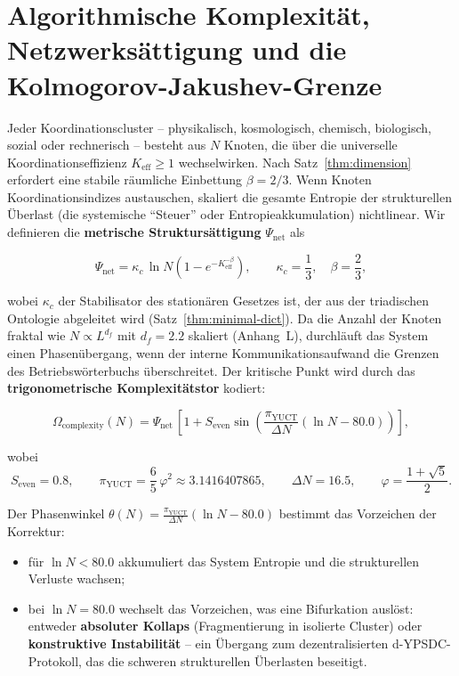 \documentclass[12pt,a4paper]{article}
\theoremstyle{remark}
\newcommand{\Keff}{K_{\mathrm{eff}}}
\newcommand{\kappac}{\kappa_c}
\newcommand{\Seven}{S_{\mathrm{even}}}
\newcommand{\piYUCT}{\pi_{\mathrm{YUCT}}}
\begin{document}
	\sloppy
	\section{Algorithmische Komplexität, Netzwerksättigung und die Kolmogorov-Jakushev-Grenze}
	\label{sec:complexity}
	
	Jeder Koordinationscluster -- physikalisch, kosmologisch, chemisch, biologisch,
	sozial oder rechnerisch -- besteht aus \(N\) Knoten, die über die universelle
	Koordinationseffizienz \(\Keff \ge 1\) wechselwirken. Nach Satz~\ref{thm:dimension}
	erfordert eine stabile räumliche Einbettung \(\beta = 2/3\). Wenn Knoten
	Koordinationsindizes austauschen, skaliert die gesamte Entropie der strukturellen
	Überlast (die systemische ``Steuer'' oder Entropieakkumulation) nichtlinear. Wir
	definieren die \textbf{metrische Struktursättigung} \(\Psi_{\mathrm{net}}\) als
	
	\begin{equation}
		\Psi_{\mathrm{net}} = \kappac \, \ln N \left(1 - e^{-\Keff^{-\beta}}\right),
		\qquad \kappac = \frac{1}{3},\quad \beta = \frac{2}{3},
		\label{eq:Psi_net}
	\end{equation}
	
	wobei \(\kappac\) der Stabilisator des stationären Gesetzes ist, der aus der
	triadischen Ontologie abgeleitet wird (Satz~\ref{thm:minimal-dict}). Da die
	Anzahl der Knoten fraktal wie \(N \propto L^{d_f}\) mit \(d_f = 2.2\) skaliert
	(Anhang~L), durchläuft das System einen Phasenübergang, wenn der interne
	Kommunikationsaufwand die Grenzen des Betriebswörterbuchs überschreitet. Der
	kritische Punkt wird durch das \textbf{trigonometrische Komplexitätstor}
	kodiert:
	
	\begin{equation}
		\Omega_{\mathrm{complexity}}(N) = \Psi_{\mathrm{net}} \,
		\left[1 + \Seven \sin\!\left( \frac{\piYUCT}{\Delta N} \left(\ln N - 80.0\right) \right) \right],
		\label{eq:Omega_complexity}
	\end{equation}
	
	wobei
	\[
	\Seven = 0.8,\qquad
	\piYUCT = \frac{6}{5}\,\varphi^2 \approx 3.1416407865,\qquad
	\Delta N = 16.5,\qquad
	\varphi = \frac{1+\sqrt{5}}{2}.
	\]
	
	Der Phasenwinkel \(\theta(N) = \frac{\piYUCT}{\Delta N} (\ln N - 80.0)\)
	bestimmt das Vorzeichen der Korrektur:
	\begin{itemize}
		\item für \(\ln N < 80.0\) akkumuliert das System Entropie und die
		strukturellen Verluste wachsen;
		\item bei \(\ln N = 80.0\) wechselt das Vorzeichen, was eine Bifurkation
		auslöst: entweder \textbf{absoluter Kollaps} (Fragmentierung in isolierte
		Cluster) oder \textbf{konstruktive Instabilität} -- ein Übergang zum
		dezentralisierten d-YPSDC-Protokoll, das die schweren strukturellen
		Überlasten beseitigt.
	\end{itemize}
	
\end{document}
